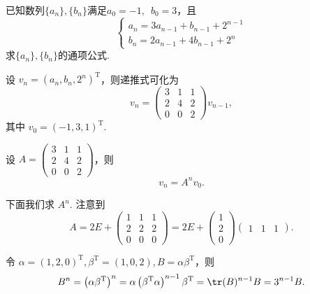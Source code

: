 \begin{exercise}
\begin{exgroup}
        \item 已知数列$\{a_n\},\{b_n\}$满足$a_0=-1,\enspace b_0=3$，且
        \[\begin{cases}
                a_n=3a_{n-1}+b_{n-1}+2^{n-1} \\
                b_n=2a_{n-1}+4b_{n-1}+2^n
            \end{cases}\]
        求$\{a_n\},\{b_n\}$的通项公式.
        \begin{answer}
            设 $v_n = (a_n, b_n, 2^n)^\mathrm{T}$，则递推式可化为
            \[
                v_n = \begin{pmatrix}
                    3 & 1 & 1 \\ 2 & 4 & 2 \\ 0 & 0 & 2
                \end{pmatrix} v_{n-1},
            \]
            其中 $v_0 = (-1, 3, 1)^\mathrm{T}$.

            设 $A = \begin{pmatrix}
                3 & 1 & 1 \\ 2 & 4 & 2 \\ 0 & 0 & 2
            \end{pmatrix}$，则
            \[
                v_n = A^n v_0.
            \]

            下面我们求 $A^n$. 注意到
            \[
                A = 2E + \begin{pmatrix}
                    1 & 1 & 1 \\ 2 & 2 & 2 \\ 0 & 0 & 0
                  \end{pmatrix}
                  = 2E + \begin{pmatrix}
                      1 \\ 2 \\ 0
                  \end{pmatrix} \begin{pmatrix}
                      1 & 1 & 1
                  \end{pmatrix}.
            \]

            令 $\alpha = (1, 2, 0)^\mathrm{T}, \beta^\mathrm{T} = (1, 0, 2), B=\alpha \beta^\mathrm{T}$，则
            \[
                B^n = \left( \alpha \beta^\mathrm{T} \right)^n = \alpha \left( \beta^\mathrm{T} \alpha \right)^{n-1} \beta^\mathrm{T} = \tr(B)^{n-1} B = 3^{n-1} B.
            \]


\end{answer}
\end{exgroup}
\end{exercise}
